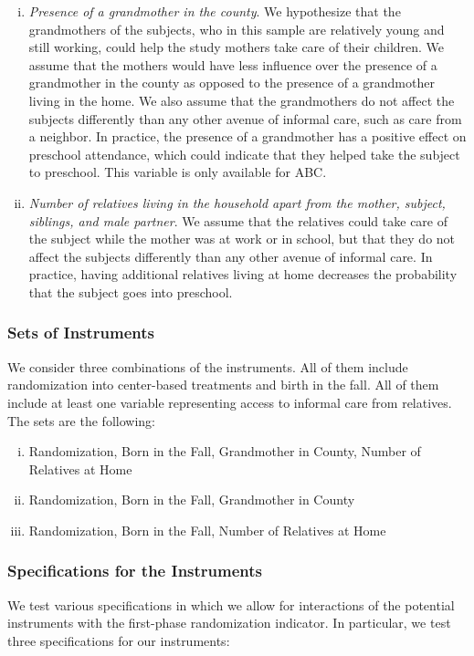 \begin{appendices}
\begin{enumerate}[(i)]
\item \textit{Presence of a grandmother in the county}. We hypothesize that the grandmothers of the subjects, who in this sample are relatively young and still working, could help the study mothers take care of their children. We assume that the mothers would have less influence over the presence of a grandmother in the county as opposed to the presence of a grandmother living in the home. We also assume that the grandmothers do not affect the subjects differently than any other avenue of informal care, such as care from a neighbor. In practice, the presence of a grandmother has a positive effect on preschool attendance, which could indicate that they helped take the subject to preschool. This variable is only available for ABC.

\item \textit{Number of relatives living in the household apart from the mother, subject, siblings, and male partner}. We assume that the relatives could take care of the subject while the mother was at work or in school, but that they do not affect the subjects differently than any other avenue of informal care. In practice, having additional relatives living at home decreases the probability that the subject goes into preschool.
\end{enumerate}

\subsubsection{Sets of Instruments}
\noindent We consider three combinations of the instruments.  All of them include randomization into center-based treatments and birth in the fall. All of them include at least one variable representing access to informal care from relatives. The sets are the following:
\begin{enumerate}[(i)]
\item Randomization, Born in the Fall, Grandmother in County, Number of Relatives at Home
\item Randomization, Born in the Fall, Grandmother in County
\item Randomization, Born in the Fall, Number of Relatives at Home
\end{enumerate}

\subsubsection{Specifications for the Instruments}
\noindent We test various specifications in which we allow for interactions of the potential instruments with the first-phase randomization indicator. In particular, we test three specifications for our instruments:


\end{appendices}
